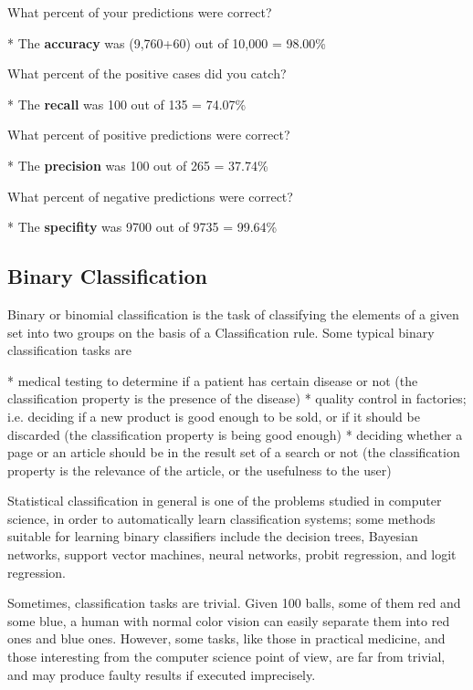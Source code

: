What percent of your predictions were correct?


*  The \textbf{accuracy} was (9,760+60) out of 10,000 = 98.00\%


What percent of the positive cases did you catch?


*  The \textbf{recall} was 100 out of 135 = 74.07\%


What percent of positive predictions were correct?


*  The \textbf{precision} was 100 out of 265 = 37.74\%


What percent of negative predictions were correct?


*  The \textbf{specifity} was 9700 out of 9735 = 99.64\%





\subsection{Binary Classification}

Binary or binomial classification is the task of classifying the elements of a given set into two groups on the basis of a Classification rule. Some typical binary classification tasks are


*  medical testing to determine if a patient has certain disease or not (the classification property is the presence of the disease)
*  quality control in factories; i.e. deciding if a new product is good enough to be sold, or if it should be discarded (the classification property is being good enough)
*  deciding whether a page or an article should be in the result set of a search or not (the classification property is the relevance of the article, or the usefulness to the user)

Statistical classification in general is one of the problems studied in computer science, in order to automatically learn classification systems; some methods suitable for learning binary classifiers include the decision trees, Bayesian networks, support vector machines, neural networks, probit regression, and logit regression.

Sometimes, classification tasks are trivial. Given 100 balls, some of them red and some blue, a human with normal color vision can easily separate them into red ones and blue ones. However, some tasks, like those in practical medicine, and those interesting from the computer science point of view, are far from trivial, and may produce faulty results if executed imprecisely.
